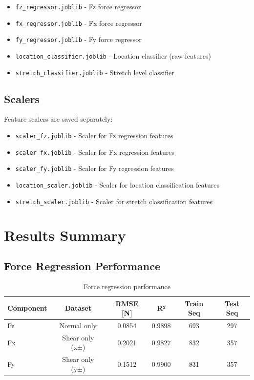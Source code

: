 \documentclass[11pt,a4paper]{article}
\begin{document}
\begin{itemize}
    \item \texttt{fz\_regressor.joblib} - Fz force regressor
    \item \texttt{fx\_regressor.joblib} - Fx force regressor
    \item \texttt{fy\_regressor.joblib} - Fy force regressor
    \item \texttt{location\_classifier.joblib} - Location classifier (raw features)
    \item \texttt{stretch\_classifier.joblib} - Stretch level classifier
\end{itemize}

\subsection{Scalers}

Feature scalers are saved separately:

\begin{itemize}
    \item \texttt{scaler\_fz.joblib} - Scaler for Fz regression features
    \item \texttt{scaler\_fx.joblib} - Scaler for Fx regression features
    \item \texttt{scaler\_fy.joblib} - Scaler for Fy regression features
    \item \texttt{location\_scaler.joblib} - Scaler for location classification features
    \item \texttt{stretch\_scaler.joblib} - Scaler for stretch classification features
\end{itemize}

\section{Results Summary}

\subsection{Force Regression Performance}

\begin{table}[H]
\centering
\begin{tabular}{@{}lccccc@{}}
\toprule
\textbf{Component} & \textbf{Dataset} & \textbf{RMSE [N]} & \textbf{R²} & \textbf{Train Seq} & \textbf{Test Seq} \\
\midrule
Fz & Normal only & 0.0854 & 0.9898 & 693 & 297 \\
Fx & Shear only (x±) & 0.2021 & 0.9827 & 832 & 357 \\
Fy & Shear only (y±) & 0.1512 & 0.9900 & 831 & 357 \\
\bottomrule
\end{tabular}
\caption{Force regression performance}
\label{tab:force_regression}
\end{table}
\end{document}
